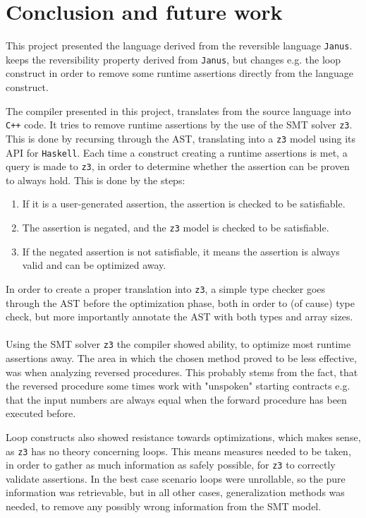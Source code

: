 \section{Conclusion and future work }
This project presented the language \lan derived from the reversible language \texttt{Janus}.
\lan keeps the reversibility property derived from \texttt{Janus}, but changes e.g. the loop
construct in order to remove some runtime assertions directly from the language construct.

The \lan compiler presented in this project, translates from the source language into \texttt{C++}
code. It tries to remove runtime assertions by the use of the SMT solver \texttt{z3}. This is
done by recursing through the AST, translating into a \texttt{z3} model using its API for
\texttt{Haskell}. Each time a construct creating a runtime assertions is met, a query is made to
\texttt{z3}, in order to determine whether the assertion can be proven to always hold. This is
done by the steps:
\begin{enumerate}
      \item If it is a user-generated assertion, the assertion is checked to be satisfiable.
      \item The assertion is negated, and the \texttt{z3} model is checked to be satisfiable.
      \item If the negated assertion is not satisfiable, it means the assertion is always valid
            and can be optimized away.
\end{enumerate}
\noindent
In order to create a proper translation into \texttt{z3}, a simple type checker goes through the
AST before the optimization phase, both in order to (of cause) type check, but more importantly
annotate the AST with both types and array sizes.
\\
\\
Using the SMT solver \texttt{z3} the \lan compiler showed ability, to optimize most runtime
assertions away. The area in which the chosen method proved to be less effective, was when
analyzing reversed procedures. This probably stems from the fact, that the reversed procedure
some times work with "unspoken" starting contracts e.g. that the input numbers are always equal
when the forward procedure has been executed before.

Loop constructs also showed resistance towards optimizations, which makes sense, as \texttt{z3}
has no theory concerning loops. This means measures needed to be taken, in order to gather as much
information as safely possible, for \texttt{z3} to correctly validate assertions. In the best case
scenario loops were unrollable, so the pure information was retrievable, but in all other
cases, generalization methods was needed, to remove any possibly wrong information from the
SMT model.

